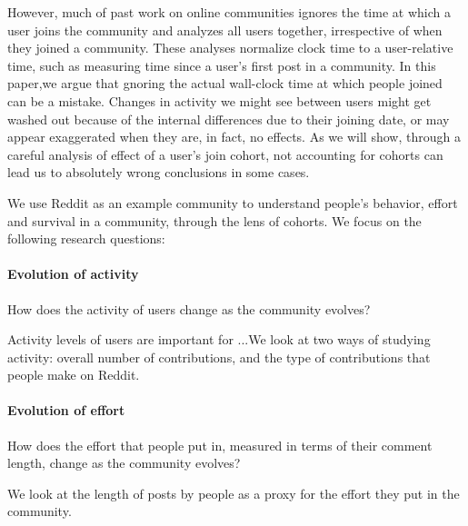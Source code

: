 However, much of past work on online communities ignores the time at which a user joins the community and analyzes all users together, irrespective of when they joined a community. These  analyses normalize clock time to a user-relative time, such as measuring time since a user's first post in a community. In this paper,we argue that gnoring the actual wall-clock time at which people joined can be a mistake. Changes in activity we might see between users might get washed out because of the internal differences due to their joining date, or may appear exaggerated when they are, in fact, no effects. As we will show, through a careful analysis of effect of a user's join cohort, not accounting for cohorts can lead us to absolutely wrong conclusions in some cases. 

We use Reddit as an example community to understand people's behavior, effort and survival in a community, through the lens of cohorts. We focus on the following research questions:

\paragraph*{Evolution of activity} How does the activity of users change as the community evolves?

Activity levels of users are important for ...We look at two ways of studying activity: overall number of contributions, and the type of contributions that people make on Reddit.

\paragraph*{Evolution of effort} How does the effort that people put in, measured in terms of their comment length, change as the community evolves?
 
We look at the length of posts by people as a proxy for the effort they put in the community. 




